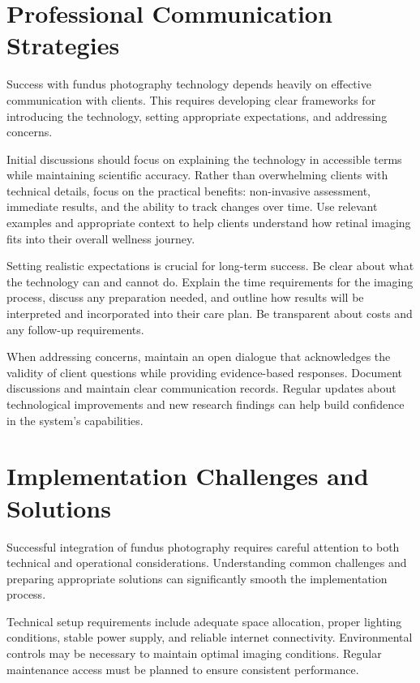 \documentclass[
  Letterpaper,
]{scrbook}
\begin{document}
\section{Professional Communication
Strategies}\label{professional-communication-strategies}

Success with fundus photography technology depends heavily on effective
communication with clients. This requires developing clear frameworks
for introducing the technology, setting appropriate expectations, and
addressing concerns.

Initial discussions should focus on explaining the technology in
accessible terms while maintaining scientific accuracy. Rather than
overwhelming clients with technical details, focus on the practical
benefits: non-invasive assessment, immediate results, and the ability to
track changes over time. Use relevant examples and appropriate context
to help clients understand how retinal imaging fits into their overall
wellness journey.

Setting realistic expectations is crucial for long-term success. Be
clear about what the technology can and cannot do. Explain the time
requirements for the imaging process, discuss any preparation needed,
and outline how results will be interpreted and incorporated into their
care plan. Be transparent about costs and any follow-up requirements.

When addressing concerns, maintain an open dialogue that acknowledges
the validity of client questions while providing evidence-based
responses. Document discussions and maintain clear communication
records. Regular updates about technological improvements and new
research findings can help build confidence in the system's
capabilities.

\section{Implementation Challenges and
Solutions}\label{implementation-challenges-and-solutions}

Successful integration of fundus photography requires careful attention
to both technical and operational considerations. Understanding common
challenges and preparing appropriate solutions can significantly smooth
the implementation process.

Technical setup requirements include adequate space allocation, proper
lighting conditions, stable power supply, and reliable internet
connectivity. Environmental controls may be necessary to maintain
optimal imaging conditions. Regular maintenance access must be planned
to ensure consistent performance.
\end{document}
